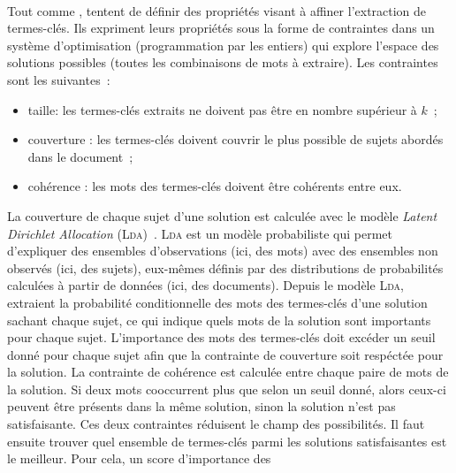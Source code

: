         \label{subsubsec:main-state_of_the_art-automatic_keyphrase_extraction-unsupervised_keyphrase_extraction-statistical_approaches:ilp}
        ~\\Tout comme ,
         tentent de définir des
        propriétés visant à affiner l'extraction de termes-clés. Ils expriment leurs propriétés sous
        la forme de contraintes dans un système d'optimisation (programmation
        par les entiers) qui explore l'espace des solutions possibles (toutes
        les combinaisons de mots à extraire). Les contraintes sont les
        suivantes~:
        \begin{itemize}
          \item{taille: les termes-clés extraits ne doivent pas être en nombre
                supérieur à $k$~;}
          \item{couverture : les termes-clés doivent couvrir le plus possible de
                sujets abordés dans le document~;}
          \item{cohérence : les mots des termes-clés doivent être cohérents
                entre eux.}
        \end{itemize}
        La couverture de chaque sujet d'une solution est calculée avec le modèle
        \textit{Latent Dirichlet Allocation} (\textsc{Lda})~\cite{blei2003lda}.
        \textsc{Lda} est un modèle probabiliste qui permet d'expliquer des
        ensembles d'observations (ici, des mots) avec des ensembles non observés
        (ici, des sujets), eux-mêmes définis par des distributions de
        probabilités calculées à partir de données (ici, des documents). Depuis
        le modèle \textsc{Lda}, 
        extraient la probabilité conditionnelle des mots des termes-clés d'une
        solution sachant chaque sujet, ce qui indique quels mots de la solution
        sont importants pour chaque sujet. L'importance des mots des termes-clés
        doit excéder un seuil donné pour chaque sujet afin que la contrainte de
        couverture soit respéctée pour la solution. La contrainte de cohérence
        est calculée entre chaque paire de mots de la solution. Si deux mots
        cooccurrent plus que selon un seuil donné, alors ceux-ci peuvent être
        présents dans la même solution, sinon la solution n'est pas
        satisfaisante. Ces deux contraintes réduisent le champ des possibilités.
        Il faut ensuite trouver quel ensemble de termes-clés parmi les solutions
        satisfaisantes est le meilleur. Pour cela, un score d'importance des
